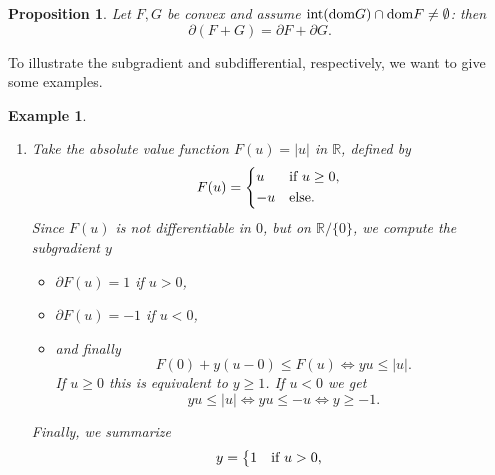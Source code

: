\documentclass{scrreprt}
\newtheorem{proposition}[theorem]{Proposition}
\newtheorem{example}[theorem]{Example}
\begin{document}
        \begin{proposition} %

            Let $F, G$ be convex and assume $\textnormal{int} (\textnormal{dom} G) \cap \textnormal{dom} F \ne \emptyset$: then
                $$
                    \partial(F + G) = \partial F + \partial G.
                $$
        \end{proposition}

        To illustrate the subgradient and subdifferential, respectively, we want to give some examples.

        \begin{example}
        \label{ex:subgradient_subdifferential}

            \begin{enumerate}
                \item Take the absolute value function $F(u) = |u|$ in $\mathbb{R}$, defined by
                    $$
                        F(u) =
                            \begin{dcases*}
                                u & \textnormal{if $u \ge 0$,} \\
                                -u & \textnormal{else}.
                            \end{dcases*}
                    $$
                Since $F(u)$ is not differentiable in $0$, but on $\mathbb{R} / \{0\}$, we compute the subgradient $y$
                    \begin{itemize}
                        \item $\partial F(u) = 1$ if $u > 0$,
                        \item $\partial F(u) = -1$ if $u < 0$,
                        \item and finally
                            $$
                                F(0) + y (u - 0) \le F(u) \Longleftrightarrow y u \le |u|.
                            $$
                        If $u \ge 0$ this is equivalent to $y \ge 1$. If $u < 0$ we get
                            $$
                                y u \le |u| \Longleftrightarrow y u \le -u \Longleftrightarrow y \ge -1.
                            $$
                    \end{itemize}
                Finally, we summarize
                    $$
                        y =
                            \begin{dcases*}
                                1 & \textnormal{if $u > 0$,} \\

\end{dcases*}$$
\end{enumerate}
\end{example}
\end{document}
